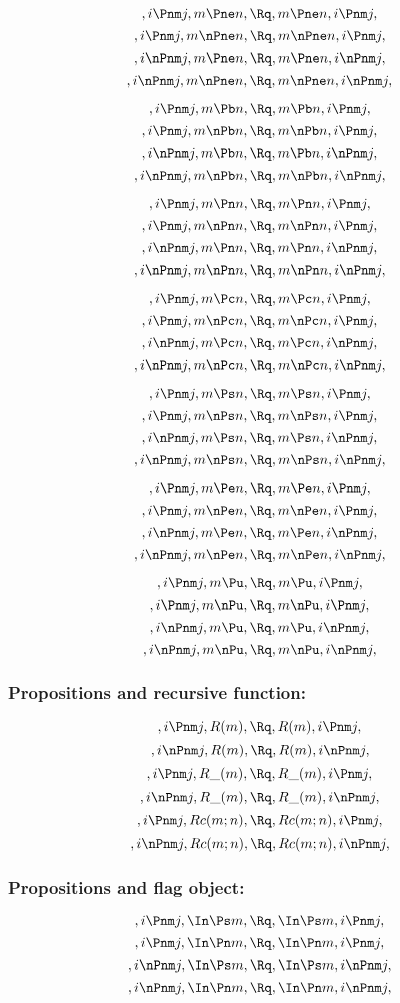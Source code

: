 \[,i \Pnm j, m \Pne n, \Rq , m \Pne n, i \Pnm j,\]
\[,i \Pnm j, m \nPne n, \Rq , m \nPne n, i \Pnm j,\]
\[,i \nPnm j, m \Pne n, \Rq , m \Pne n, i \nPnm j,\]
\[,i \nPnm j, m \nPne n, \Rq , m \nPne n, i \nPnm j,\]

\[,i \Pnm j, m \Pb n, \Rq , m \Pb n, i \Pnm j,\]
\[,i \Pnm j, m \nPb n, \Rq , m \nPb n, i \Pnm j,\]
\[,i \nPnm j, m \Pb n, \Rq , m \Pb n, i \nPnm j,\]
\[,i \nPnm j, m \nPb n, \Rq , m \nPb n, i \nPnm j,\]

\[,i \Pnm j, m \Pn n, \Rq , m \Pn n, i \Pnm j,\]
\[,i \Pnm j, m \nPn n, \Rq , m \nPn n, i \Pnm j,\]
\[,i \nPnm j, m \Pn n, \Rq , m \Pn n, i \nPnm j,\]
\[,i \nPnm j, m \nPn n, \Rq , m \nPn n, i \nPnm j,\]

\[,i \Pnm j, m \Pc n, \Rq , m \Pc n, i \Pnm j,\]
\[,i \Pnm j, m \nPc n, \Rq , m \nPc n, i \Pnm j,\]
\[,i \nPnm j, m \Pc n, \Rq , m \Pc n, i \nPnm j,\]
\[,i \nPnm j, m \nPc n, \Rq , m \nPc n, i \nPnm j,\]

\[,i \Pnm j, m \Ps n, \Rq , m \Ps n, i \Pnm j,\]
\[,i \Pnm j, m \nPs n, \Rq , m \nPs n, i \Pnm j,\]
\[,i \nPnm j, m \Ps n, \Rq , m \Ps n, i \nPnm j,\]
\[,i \nPnm j, m \nPs n, \Rq , m \nPs n, i \nPnm j,\]


\[,i \Pnm j, m \Pe n, \Rq , m \Pe n, i \Pnm j,\]
\[,i \Pnm j, m \nPe n, \Rq , m \nPe n, i \Pnm j,\]
\[,i \nPnm j, m \Pe n, \Rq , m \Pe n, i \nPnm j,\]
\[,i \nPnm j, m \nPe n, \Rq , m \nPe n, i \nPnm j,\]

\[,i \Pnm j, m \Pu, \Rq , m \Pu, i \Pnm j,\]
\[,i \Pnm j, m \nPu, \Rq , m \nPu, i \Pnm j,\]
\[,i \nPnm j, m \Pu, \Rq , m \Pu, i \nPnm j,\]
\[,i \nPnm j, m \nPu, \Rq , m \nPu, i \nPnm j,\]







\bigskip
\bigskip
\bigskip
\bigskip
\subsubsection{ Propositions and recursive function:}
\[,i \Pnm j, R(m), \Rq , R(m), i \Pnm j,\]
\[,i \nPnm j,R(m), \Rq , R(m), i \nPnm j,\]
\[,i \Pnm j, R\_(m), \Rq , R\_(m), i \Pnm j,\]
\[,i \nPnm j, R\_(m), \Rq , R\_(m), i \nPnm j,\]
\[,i \Pnm j, Rc(m;n), \Rq , Rc(m;n), i \Pnm j,\]
\[,i \nPnm j,Rc(m;n), \Rq , Rc(m;n), i \nPnm j,\]





\bigskip
\bigskip
\bigskip
\bigskip
\subsubsection{ Propositions and flag object:}
\[,i \Pnm j, \In \Ps m, \Rq , \In \Ps m, i \Pnm j,\]
\[,i \Pnm j, \In \Pn m, \Rq , \In \Pn m, i \Pnm j,\]
\[,i \nPnm j,\In \Ps m, \Rq , \In \Ps m, i \nPnm j,\]
\[,i \nPnm j, \In \Pn m, \Rq , \In \Pn m, i \nPnm j,\]

